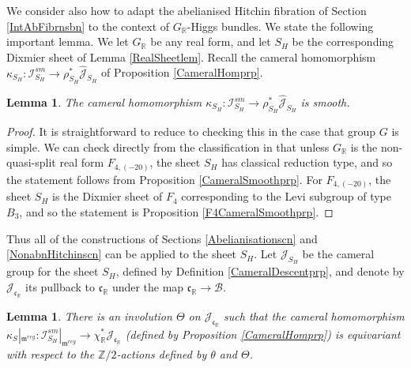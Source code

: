\documentclass{amsart}
\newtheorem{lemma}[theorem]{Lemma}
\theoremstyle{remark}
\numberwithin{theorem}{section}
\numberwithin{equation}{section}
\begin{document}
We consider also how to adapt the abelianised Hitchin fibration of Section \ref{IntAbFibrnsbn} to the context of $G_{\mathbb{R}}$-Higgs bundles. We state the following important lemma. We let $G_\mathbb{R}$ be any real form, and let $S_H$ be the corresponding Dixmier sheet of Lemma \ref{RealSheetlem}. Recall the cameral homomorphism $\kappa_{S_H}:\mathcal I_{S_H}^{sm} \rightarrow \rho_{S_H}^*\hat{\mathcal J}_{S_H}$ of Proposition \ref{CameralHomprp}.

\begin{lemma}\label{CameralSmoothReallem}
    The cameral homomorphism $\kappa_{S_H}:\mathcal I_{S_H}^{sm} \rightarrow \rho_{S_H}^*\hat{\mathcal J}_{S_H}$ is smooth.
\end{lemma}

\begin{proof}
It is straightforward to reduce to checking this in the case that group $G$ is simple. We can check directly from the classification in \cite[5.11]{Araki} that unless $G_\mathbb{R}$ is the non-quasi-split real form $F_{4,(-20)}$, the sheet $S_H$ has classical reduction type, and so the statement follows from Proposition \ref{CameralSmoothprp}. For $F_{4,(-20)}$, the sheet $S_H$ is the Dixmier sheet of $F_4$ corresponding to the Levi subgroup of type $B_3$, and so the statement is Proposition \ref{F4CameralSmoothprp}.
\end{proof}

Thus all of the constructions of Sections \ref{Abelianisationscn} and \ref{NonabnHitchinscn} can be applied to the sheet $S_H$. Let $\mathcal J_{S_H}$ be the cameral group for the sheet $S_H$, defined by Definition \ref{CameralDescentprp}, and denote by $\mathcal J_{\mathfrak{c_\mathbb{R}}}$ its pullback to $\mathfrak{c}_\mathbb{R}$ under the map $\mathfrak{c}_\mathbb{R} \rightarrow \mathcal B$.

\begin{lemma}\label{CameralHomInvollem}
    There is an involution $\Theta$ on $\mathcal J_{\mathfrak{c}_{\mathbb{R}}}$ such that the cameral homomorphism $\kappa_S|_{\mathfrak{m}^{reg}}: \mathcal I^{sm}_{S_H}|_{\mathfrak{m}^{reg}} \rightarrow \chi_\mathbb{R}^*\mathcal J_{\mathfrak{c}_\mathbb{R}}$ (defined by Proposition \ref{CameralHomprp}) is equivariant with respect to the $\mathbb{Z}/2$-actions defined by $\theta$ and $\Theta$.
\end{lemma}
\end{document}
